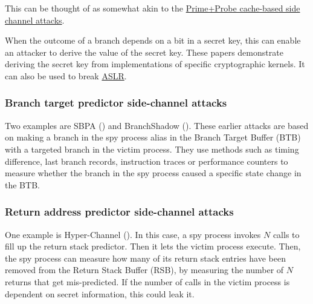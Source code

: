 \documentclass[
  a4paper,
]{report}
\begin{document}
This can be thought of as somewhat akin to the
\hyperref[primeprobe]{Prime+Probe cache-based side channel attacks}.

When the outcome of a branch depends on a bit in a secret key, this can
enable an attacker to derive the value of the secret key. These papers
demonstrate deriving the secret key from implementations of specific
cryptographic kernels. It can also be used to break
\hyperref[aslr]{\label{__index_entry_151}{ASLR}}.

\subsubsection{Branch target predictor side-channel
attacks}\label{branch-target-predictor-side-channel-attacks}

\label{__index_entry_152}{}

Two examples are
\label{__index_entry_153}{SBPA}
() and
\label{__index_entry_154}{BranchShadow}
(). These earlier attacks are
based on making a branch in the spy process alias in the
\label{__index_entry_155}{Branch Target Buffer
(BTB)} with a targeted branch in the
victim process. They use methods such as timing difference,
\label{__index_entry_156}{last branch
records},
\label{__index_entry_157}{instruction
traces} or
\label{__index_entry_158}{performance
counters} to measure whether the branch in
the spy process caused a specific state change in the BTB.

\subsubsection{Return address predictor side-channel
attacks}\label{return-address-predictor-side-channel-attacks}

\label{__index_entry_159}{}

One example is
\label{__index_entry_160}{Hyper-Channel}
(). In this case, a spy process
invokes \(N\) calls to fill up the return stack predictor. Then it lets
the victim process execute. Then, the spy process can measure how many
of its return stack entries have been removed from the Return Stack
Buffer (RSB), by measuring the number of \(N\) returns that get
mis-predicted. If the number of calls in the victim process is dependent
on secret information, this could leak it.
\end{document}
